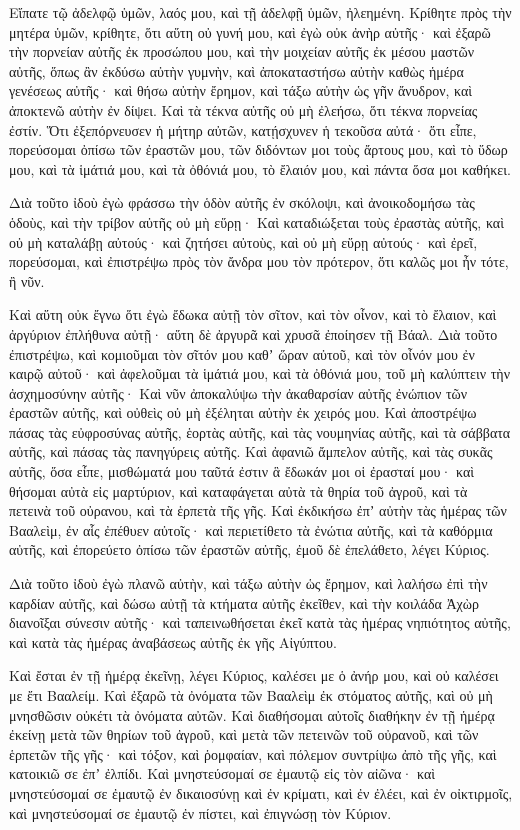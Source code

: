 \begin{spacing}{1.1}
\begin{multicols}{2}
Εἴπατε τῷ ἀδελφῷ ὑμῶν, λαός μου, καὶ τῇ ἀδελφῇ ὑμῶν, ἠλεημένη.
Κρίθητε πρὸς τὴν μητέρα ὑμῶν, κρίθητε, ὅτι αὕτη οὐ γυνή μου, καὶ ἐγὼ οὐκ ἀνὴρ αὐτῆς· καὶ ἐξαρῶ τὴν πορνείαν αὐτῆς ἐκ προσώπου μου, καὶ τὴν μοιχείαν αὐτῆς ἐκ μέσου μαστῶν αὐτῆς,
ὅπως ἂν ἐκδύσω αὐτὴν γυμνὴν, καὶ ἀποκαταστήσω αὐτὴν καθὼς ἡμέρα γενέσεως αὐτῆς· καὶ θήσω αὐτὴν ἔρημον, καὶ τάξω αὐτὴν ὡς γῆν ἄνυδρον, καὶ ἀποκτενῶ αὐτὴν ἐν δίψει.
Καὶ τὰ τέκνα αὐτῆς οὐ μὴ ἐλεήσω, ὅτι τέκνα πορνείας ἐστίν.
Ὅτι ἐξεπόρνευσεν ἡ μήτηρ αὐτῶν, κατῄσχυνεν ἡ τεκοῦσα αὐτά· ὅτι εἶπε, πορεύσομαι ὀπίσω τῶν ἐραστῶν μου, τῶν διδόντων μοι τοὺς ἄρτους μου, καὶ τὸ ὕδωρ μου, καὶ τὰ ἱμάτιά μου, καὶ τὰ ὀθόνιά μου, τὸ ἔλαιόν μου, καὶ πάντα ὅσα μοι καθήκει.

Διὰ τοῦτο ἰδοὺ ἐγὼ φράσσω τὴν ὁδὸν αὐτῆς ἐν σκόλοψι, καὶ ἀνοικοδομήσω τὰς ὁδοὺς, καὶ τὴν τρίβον αὐτῆς οὐ μὴ εὕρῃ·
Καὶ καταδιώξεται τοὺς ἐραστὰς αὐτῆς, καὶ οὐ μὴ καταλάβῃ αὐτούς· καὶ ζητήσει αὐτοὺς, καὶ οὐ μὴ εὕρῃ αὐτούς· καὶ ἐρεῖ, πορεύσομαι, καὶ ἐπιστρέψω πρὸς τὸν ἄνδρα μου τὸν πρότερον, ὅτι καλῶς μοι ἦν τότε, ἢ νῦν.

Καὶ αὕτη οὐκ ἔγνω ὅτι ἐγὼ ἔδωκα αὐτῇ τὸν σῖτον, καὶ τὸν οἶνον, καὶ τὸ ἔλαιον, καὶ ἀργύριον ἐπλήθυνα αὐτῇ· αὕτη δὲ ἀργυρᾶ καὶ χρυσᾶ ἐποίησεν τῇ Βάαλ.
Διὰ τοῦτο ἐπιστρέψω, καὶ κομιοῦμαι τὸν σῖτόν μου καθʼ ὥραν αὐτοῦ, καὶ τὸν οἶνόν μου ἐν καιρῷ αὐτοῦ· καὶ ἀφελοῦμαι τὰ ἱμάτιά μου, καὶ τὰ ὀθόνιά μου, τοῦ μὴ καλύπτειν τὴν ἀσχημοσύνην αὐτῆς·
Καὶ νῦν ἀποκαλύψω τὴν ἀκαθαρσίαν αὐτῆς ἐνώπιον τῶν ἐραστῶν αὐτῆς, καὶ οὐθεὶς οὐ μὴ ἐξέληται αὐτὴν ἐκ χειρός μου.
Καὶ ἀποστρέψω πάσας τὰς εὐφροσύνας αὐτῆς, ἑορτὰς αὐτῆς, καὶ τὰς νουμηνίας αὐτῆς, καὶ τὰ σάββατα αὐτῆς, καὶ πάσας τὰς πανηγύρεις αὐτῆς.
Καὶ ἀφανιῶ ἄμπελον αὐτῆς, καὶ τὰς συκᾶς αὐτῆς, ὅσα εἶπε, μισθώματά μου ταῦτά ἐστιν ἃ ἔδωκάν μοι οἱ ἐρασταί μου· καὶ θήσομαι αὐτὰ εἰς μαρτύριον, καὶ καταφάγεται αὐτὰ τὰ θηρία τοῦ ἀγροῦ, καὶ τὰ πετεινὰ τοῦ οὐρανου, καὶ τὰ ἑρπετὰ τῆς γῆς.
Καὶ ἐκδικήσω ἐπʼ αὐτὴν τὰς ἡμέρας τῶν Βααλεὶμ, ἐν αἷς ἐπέθυεν αὐτοῖς· καὶ περιετίθετο τὰ ἐνώτια αὐτῆς, καὶ τὰ καθόρμια αὐτῆς, καὶ ἐπορεύετο ὀπίσω τῶν ἐραστῶν αὐτῆς, ἐμοῦ δὲ ἐπελάθετο, λέγει Κύριος.

Διὰ τοῦτο ἰδοὺ ἐγὼ πλανῶ αὐτὴν, καὶ τάξω αὐτὴν ὡς ἔρημον, καὶ λαλήσω ἐπὶ τὴν καρδίαν αὐτῆς,
καὶ δώσω αὐτῇ τὰ κτήματα αὐτῆς ἐκεῖθεν, καὶ τὴν κοιλάδα Ἀχὼρ διανοῖξαι σύνεσιν αὐτῆς· καὶ ταπεινωθήσεται ἐκεῖ κατὰ τὰς ἡμέρας νηπιότητος αὐτῆς, καὶ κατὰ τὰς ἡμέρας ἀναβάσεως αὐτῆς ἐκ γῆς Αἰγύπτου.

Καὶ ἔσται ἐν τῇ ἡμέρᾳ ἐκεῖνῃ, λέγει Κύριος, καλέσει με ὁ ἀνήρ μου, καὶ οὐ καλέσει με ἔτι Βααλείμ.
Καὶ ἐξαρῶ τὰ ὀνόματα τῶν Βααλεὶμ ἐκ στόματος αὐτῆς, καὶ οὐ μὴ μνησθῶσιν οὐκέτι τὰ ὀνόματα αὐτῶν.
Καὶ διαθήσομαι αὐτοῖς διαθήκην ἐν τῇ ἡμέρᾳ ἐκείνῃ μετὰ τῶν θηρίων τοῦ ἀγροῦ, καὶ μετὰ τῶν πετεινῶν τοῦ οὐρανοῦ, καὶ τῶν ἑρπετῶν τῆς γῆς· καὶ τόξον, καὶ ῥομφαίαν, καὶ πόλεμον συντρίψω ἀπὸ τῆς γῆς, καὶ κατοικιῶ σε ἐπʼ ἐλπίδι.
Καὶ μνηστεύσομαί σε ἐμαυτῷ εἰς τὸν αἰῶνα· καὶ μνηστεύσομαί σε ἐμαυτῷ ἐν δικαιοσύνῃ καὶ ἐν κρίματι, καὶ ἐν ἐλέει, καὶ ἐν οἰκτιρμοῖς,
καὶ μνηστεύσομαί σε ἐμαυτῷ ἐν πίστει, καὶ ἐπιγνώσῃ τὸν Κύριον.


\end{multicols}
\end{spacing}
